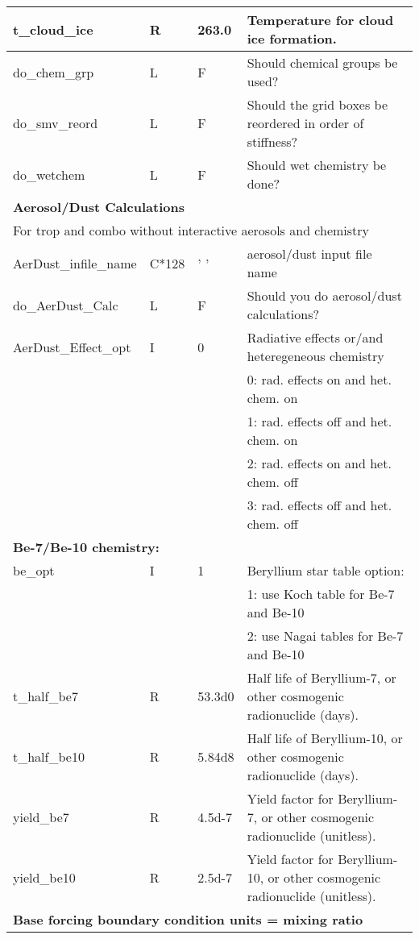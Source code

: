 {\begin{landscape}
\begin{center}
\begin{longtable}{|l|l|l|l|}
t\_cloud\_ice     & R & 263.0 & Temperature for cloud ice formation.  \\ \hline
do\_chem\_grp     & L & F & Should chemical groups be used?  \\ \hline
do\_smv\_reord    & L & F & Should the grid boxes be reordered in order of stiffness?  \\ \hline
do\_wetchem      & L & F & Should wet chemistry be done?  \\ \hline
\multicolumn{4}{|l|}{\bf Aerosol/Dust Calculations} \\ 
\multicolumn{4}{|l|}{For trop and combo without interactive aerosols and chemistry} \\ \hline
AerDust\_infile\_name &C*128& ' ' & aerosol/dust input file name  \\ \hline
do\_AerDust\_Calc    & L &    F    & Should you do aerosol/dust calculations?  \\ \hline\hline
AerDust\_Effect\_opt & I &    0    & Radiative effects or/and heteregeneous chemistry  \\ 
 &  &        & 0: rad. effects on  and het. chem. on  \\ 
 &  &        & 1: rad. effects off and het. chem. on  \\ 
 &  &        & 2: rad. effects on  and het. chem. off  \\ 
 &  &        & 3: rad. effects off and het. chem. off  \\ \hline
\multicolumn{4}{|l|}{\bf Be-7/Be-10 chemistry: } \\ \hline
be\_opt        & I &    1    & Beryllium star table option:  \\
                 &   &   & 1:  use Koch  table  for Be-7 and Be-10  \\
                 &   &   & 2:  use Nagai tables for Be-7 and Be-10  \\ \hline
t\_half\_be7    & R & 53.3d0  & Half life    of  Beryllium-7,  or other cosmogenic radionuclide (days).  \\ \hline
t\_half\_be10   & R &  5.84d8 & Half life    of  Beryllium-10, or other cosmogenic   radionuclide (days).  \\ \hline
yield\_be7     & R &  4.5d-7 & Yield factor for Beryllium-7,  or other cosmogenic radionuclide (unitless).  \\ \hline
yield\_be10    & R &  2.5d-7 & Yield factor for Beryllium-10, or other cosmogenic radionuclide (unitless).  \\ \hline
\multicolumn{4}{|l|}{\bf Base forcing boundary condition units = mixing ratio} \\ \hline

\end{longtable}
\end{center}
\end{landscape}}
